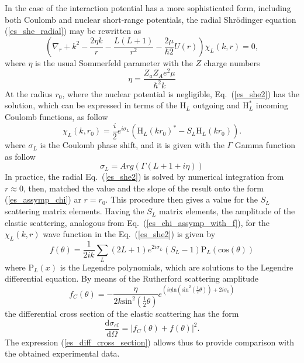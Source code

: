 \documentclass[
11pt, %
english, %
onehalfspacing, %
headsepline, %
]{MastersDoctoralThesis} %
\begin{document}
In the case of the interaction potential has a more sophisticated form, including both Coulomb and nuclear short-range  potentials, the radial Shr\"{o}dinger equation (\ref{es_she_radial}) may be rewritten as
\begin{equation}
\left( \nabla_r + k^2 - \frac{2 \eta k}{r} - \frac{L(L+1)}{r^2} - \frac{2 \mu}{\hbar2} U \left( r \right) \right) \chi_L \left( k,r \right) =0,
\label{es_she2}
\end{equation}
where $\eta$ is the usual Sommerfeld parameter with the $Z$ charge numbers
\begin{equation*}
\eta=\frac{Z_a Z_A e^2 \mu}{\hbar^2 k}
\end{equation*}
At the radius $r_0$, where the nuclear potential is negligible, Eq.~(\ref{es_she2}) has the solution, which can be expressed in terms of the $\text{H}_L$ outgoing  and $\text{H}_L^*$ incoming Coulomb functions, as follow
\begin{equation}
\chi_L \left( k,r_0 \right)= \frac{i}{2}e^{i \sigma_L} \left( \text{H}_L(kr_0)^*
-S_L \text{H}_L(kr_0)\right).
\label{es_assymp_chi}
\end{equation} 
where $\sigma_L$ is the Coulomb phase shift, and it is given with the $\Gamma$ Gamma function as follow
\begin{equation*}
\sigma_L=Arg\left( \Gamma \left( L+1+i \eta \right) \right)
\end{equation*}
In practice, the radial Eq.~(\ref{es_she2}) is solved by numerical integration from $r \approx 0$, then, matched the value and the slope of the result onto the form (\ref{es_assymp_chi}) ar $r=r_0$. This procedure then gives a value for the $S_L$ scattering matrix elements. Having the $S_L$ matrix elements, the amplitude  of the elastic scattering, analogous  from Eq.~(\ref{es_chi_assymp_with_f}), for the $\chi_L \left( k,r \right)$ wave function in the Eq.~(\ref{es_she2}) is given by
\begin{equation}
f(\theta)=\frac{1}{2ik} \sum_{L} (2L+1) e^{2i\sigma_L} \left( S_L - 1 \right)
\text{P}_L(\text{cos}(\theta))
\label{es_amplitude_nuclear}
\end{equation}
where $\text{P}_L(x)$ is the Legendre polynomials, which are solutions to the Legendre differential equation.
By means of the Rutherford scattering amplitude 
\begin{equation}
f_C(\theta)=-\frac{\eta}{2 k {\text{sin}}^2 \left( \tfrac{1}{2} \theta \right) }
e^{\left( i \eta \text{ln}\left( \text{sin}^2 \left( \tfrac{1}{2} \theta \right) \right)
+2i \sigma_{0} \right)}
\end{equation}
the differential cross section of the elastic scattering has the form
\begin{equation}
\frac{\text{d} \sigma_{el}}{\text{d} \Omega} = \vert f_C(\theta) + f(\theta) \vert^2.
\label{es_diff_cross_section}
\end{equation} 
The expression (\ref{es_diff_cross_section}) allows thus to provide comparison with the obtained  experimental data.   
\end{document}
